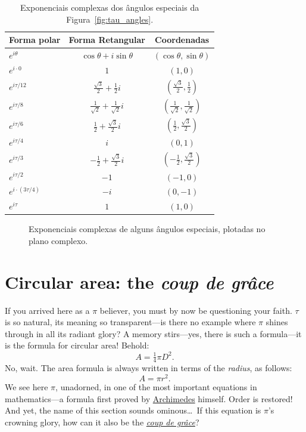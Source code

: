 {\begin{table}
\begin{center}
\begin{tabular}{lcc}
Forma polar & Forma Retangular & Coordenadas \\ \hline\hline
$e^{i\theta}$ & $\cos\theta + i\sin\theta$ & $(\cos\theta, \sin\theta)$ \\ \hline
$e^{i\cdot0}$ & $1$ & $(1, 0)$ \smallskip \\
$e^{i\tau/12}$ & $\frac{\sqrt{3}}{2} + \frac{1}{2}i$ & $(\frac{\sqrt{3}}{2}, \frac{1}{2})$ \smallskip \\
$e^{i\tau/8}$ & $\frac{1}{\sqrt{2}} +  \frac{1}{\sqrt{2}}i$ & $(\frac{1}{\sqrt{2}}, \frac{1}{\sqrt{2}})$ \smallskip \\
$e^{i\tau/6}$ & $\frac{1}{2} +\frac{\sqrt{3}}{2} i$ & $(\frac{1}{2}, \frac{\sqrt{3}}{2})$ \smallskip \\
$e^{i\tau/4}$ & $i$ & $(0, 1)$ \smallskip \\
$e^{i\tau/3}$ & $-\frac{1}{2} +\frac{\sqrt{3}}{2} i$ & $(-\frac{1}{2}, \frac{\sqrt{3}}{2})$ \smallskip \\
$e^{i\tau/2}$ & $-1$ & $(-1, 0)$ \smallskip \\
$e^{i\cdot(3\tau/4)}$ & $-i$ & $(0, -1)$ \smallskip \\
$e^{i\tau}$ & $1$ & $(1, 0)$
\end{tabular}
\end{center}
\caption{Exponenciais complexas dos ângulos especiais da Figura~\ref{fig:tau_angles}.\label{table:complex_exponentials}}
\end{table}

\begin{figure}
\begin{center}
\end{center}
\caption{Exponenciais complexas de alguns ângulos especiais, plotadas no plano complexo.\label{fig:tau_euler_circle}}
\end{figure}


\section{Circular area: the \emph{coup de gr\^{a}ce}} %
\label{sec:circular_area}

If you arrived here as a $\pi$ believer, you must by now be questioning your faith. $\tau$ is so natural, its meaning so transparent---is there no example where $\pi$ shines through in all its radiant glory? A memory stirs---yes, there is such a formula---it is the formula for circular area! Behold:
\[ A = \tfrac{1}{4} \pi D^2. \]
No, wait. The area formula is always written in terms of the \emph{radius}, as follows:
\[ A = \pi r^2. \]
We see here $\pi$, unadorned, in one of the most important equations in mathe\-matics---a formula first proved by \href{https://en.wikipedia.org/wiki/Archimedes}{Archimedes} himself. Order is restored! And yet, the name of this section sounds ominous\ldots\ If this equation is $\pi$'s crowning glory, how can it also be the \href{https://en.wikipedia.org/wiki/Coup_de_grace}{\emph{coup de gr\^{a}ce}}?


}
